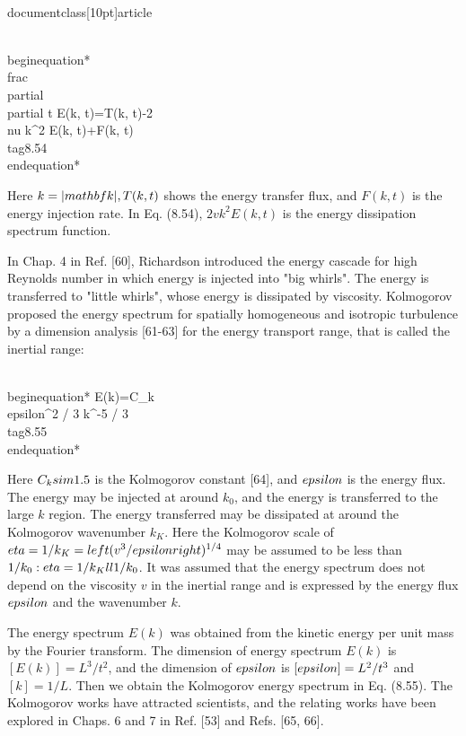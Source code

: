 \\documentclass[10pt]{article}
\begin{document}
{{{{{\\begin{equation*}
\\frac{\\partial}{\\partial t} E(k, t)=T(k, t)-2 \\nu k^{2} E(k, t)+F(k, t) \\tag{8.54}
\\end{equation*}


Here $k=|\\mathbf{k}|, T(k, t)$ shows the energy transfer flux, and $F(k, t)$ is the energy injection rate. In Eq. (8.54), $2 v k^{2} E(k, t)$ is the energy dissipation spectrum function.

In Chap. 4 in Ref. [60], Richardson introduced the energy cascade for high Reynolds number in which energy is injected into "big whirls". The energy is transferred to "little whirls", whose energy is dissipated by viscosity. Kolmogorov proposed the energy spectrum for spatially homogeneous and isotropic turbulence by a dimension analysis [61-63] for the energy transport range, that is called the inertial range:


\\begin{equation*}
E(k)=C_{k} \\epsilon^{2 / 3} k^{-5 / 3} \\tag{8.55}
\\end{equation*}


Here $C_{k} \\sim 1.5$ is the Kolmogorov constant [64], and $\\epsilon$ is the energy flux. The energy may be injected at around $k_{0}$, and the energy is transferred to the large $k$ region. The energy transferred may be dissipated at around the Kolmogorov wavenumber $k_{K}$. Here the Kolmogorov scale of $\\eta=1 / k_{K}=\\left(v^{3} / \\epsilon\\right)^{1 / 4}$ may be assumed to be less than $1 / k_{0}: \\eta=1 / k_{K} \\ll 1 / k_{0}$. It was assumed that the energy spectrum does not depend on the viscosity $v$ in the inertial range and is expressed by the energy flux $\\epsilon$ and the wavenumber $k$.

The energy spectrum $E(k)$ was obtained from the kinetic energy per unit mass by the Fourier transform. The dimension of energy spectrum $E(k)$ is $[E(k)]=L^{3} / t^{2}$, and the dimension of $\\epsilon$ is $[\\epsilon]=L^{2} / t^{3}$ and $[k]=1 / L$. Then we obtain the Kolmogorov energy spectrum in Eq. (8.55). The Kolmogorov works have attracted scientists, and the relating works have been explored in Chaps. 6 and 7 in Ref. [53] and Refs. [65, 66].

}}}}}
\end{document}
